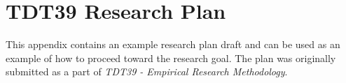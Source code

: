 \documentclass[10pt, a4paper]{report}
\begin{document}

  

  
  

  \tableofcontents \thispagestyle{empty}
  \listoffigures \thispagestyle{empty}
  
  \clearpage

  \setcounter{page}{1}

  
  

  
  
  
  
  
  
  

  

  
  
  
  \appendix

  \chapter{TDT39 Research Plan}
  This appendix contains an example research plan draft and can be used as an example of how to proceed toward the research goal. The plan was originally submitted as a part of \textit{TDT39 - Empirical Research Methodology}.

  
\end{document}
